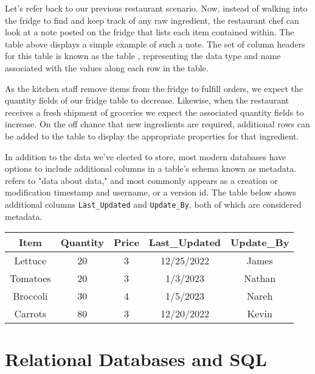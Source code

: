 Let's refer back to our previous restaurant scenario. Now, instead of walking into the fridge to find and keep track of any raw ingredient, the restaurant chef can look at a note posted on the fridge that lists each item contained within. The table above displays a simple example of such a note. The set of column headers for this table is known as the table , representing the data type and name associated with the values along each row in the table.

As the kitchen staff remove items from the fridge to fulfill orders, we expect the quantity fields of our fridge table to decrease. Likewise, when the restaurant receives a fresh shipment of groceries we expect the associated quantity fields to increase. On the off chance that new ingredients are required, additional rows can be added to the table to display the appropriate properties for that ingredient.

\begin{kaobox}[title=Getting Meta...]
    In addition to the data we've elected to store, most modern databases have options to include additional columns in a table's schema known as metadata.  refers to "data about data," and most commonly appears as a creation or modification timestamp and username, or a version id. The table below shows additional columns \texttt{Last\_Updated} and \texttt{Update\_By}, both of which are considered metadata.

    \begin{center}
        \begin{tabular}{ |c|c|c|c|c| } 
            \hline
            \textbf{Item} & \textbf{Quantity} & \textbf{Price} & \textbf{Last\_Updated} & \textbf{Update\_By} \\ 
            \hline
            Lettuce & 20 & 3 & 12/25/2022 & James \\ 
            \hline
            Tomatoes & 20 & 3 & 1/3/2023 & Nathan \\ 
            \hline
            Broccoli & 30 & 4 & 1/5/2023 & Nareh \\ 
            \hline
            Carrots & 80 & 3 & 12/20/2022 & Kevin \\ 
            \hline
        \end{tabular}
    \end{center}
\end{kaobox}


\section{Relational Databases and SQL}

